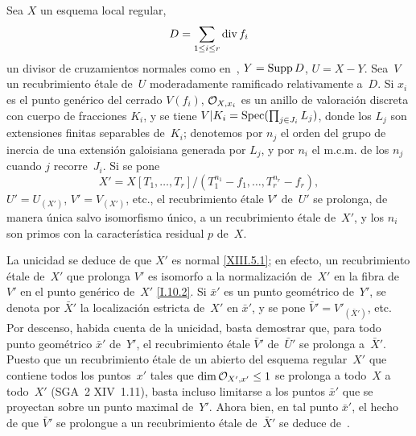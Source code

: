 
\begin{proposition}
\label{XIII.5.2}
%
Sea $X$ un esquema local regular,
$$
D=\sum_{1\leq i\leq r} \divisor f_i
$$
un divisor de cruzamientos normales como en~,
$Y=\Supp D$, $U=X-Y$. Sea~$V$ un recubrimiento étale de~$U$
moderadamente ramificado relativamente a~$D$. Si $x_i$ es el punto
genérico del cerrado $V(f_i)$, $\cal{O}_{X,x_i}$ es un anillo de
valoración discreta con cuerpo de fracciones $K_i$, y se tiene
$V|K_i=\Spec(\prod_{j\in J_i}L_j)$, donde los $L_j$ son extensiones
finitas separables de~$K_i$; denotemos por $n_j$ el orden del grupo de
inercia de una extensión galoisiana generada por $L_j$, y por $n_i$
el m.c.m. de los $n_j$ cuando $j$ recorre~$J_i$. Si se pone
$$
X'=X[T_1,\dots,T_r]/(T_1^{n_1}-f_1,\dots,T_r^{n_r}-f_r),
$$
$U'=U_{(X')}$, $V'=V_{(X')}$, etc., el recubrimiento étale $V'$
de~$U'$ se prolonga, de manera única salvo isomorfismo único, a un
recubrimiento étale de~$X'$, y los $n_i$ son primos con la
característica residual $p$ de~$X$.
\end{proposition}

La unicidad se deduce de que $X'$ es normal \eqref{XIII.5.1}; en
efecto,
un recubrimiento étale de~$X'$ que prolonga $V'$ es isomorfo a la
normalización de~$X'$ en la fibra de~$V'$ en el punto genérico
de~$X'$ \eqref{I.10.2}. Si $\bar{x}'$ es un punto geométrico de~$Y'$,
se denota por $\bar{X}'$ la localización estricta de~$X'$ en
$\bar{x}'$, y se pone $\bar{V}'=V'_{(\bar{X}')}$, etc. Por descenso,
habida cuenta de la unicidad, basta demostrar que, para todo punto
geométrico $\bar{x}'$ de~$Y'$, el recubrimiento étale $\bar{V}'$
de~$\bar{U}'$ se prolonga a~$\bar{X}'$. Puesto que un recubrimiento
étale de un abierto del esquema regular~$X'$ que contiene todos los
puntos~$x'$ tales que $\dim\cal{O}_{X',x'}\leq 1$ se prolonga
{a todo~$X$}
{a todo~$X'$}
(SGA~2 XIV~1.11), basta incluso limitarse a los puntos
$\bar{x}'$ que se proyectan sobre un punto maximal de~$Y'$. Ahora
bien, en tal punto $\bar{x}'$, el hecho de que $\bar{V}'$ se prolongue
a un recubrimiento étale de~$\bar{X}'$ se deduce de~.

